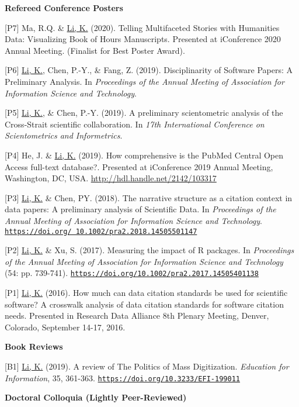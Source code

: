 \documentclass[margin, 10pt]{res} %
\begin{document}
\begin{resume}
\textbf{Refereed Conference Posters}

[P7] Ma, R.Q. \& \underline{Li, K.} (2020). Telling Multifaceted Stories with Humanities Data: Visualizing Book of Hours Manuscripts. Presented at iConference 2020 Annual Meeting. (Finalist for Best Poster Award).

[P6] \underline{Li, K.}, Chen, P.-Y., \& Fang, Z. (2019). Disciplinarity of Software Papers: A Preliminary Analysis. In \textit{Proceedings of the Annual Meeting of Association for Information Science and Technology}.

[P5] \underline{Li, K.}, \& Chen, P.-Y. (2019). A preliminary scientometric analysis of the Cross-Strait scientific collaboration. In \textit{17th International Conference on Scientometrics and Informetrics}.

[P4] He, J. \& \underline{Li, K.} (2019). How comprehensive is the PubMed Central Open Access full-text database?. Presented at iConference 2019 Annual Meeting, Washington, DC, USA. \href{http://hdl.handle.net/2142/103317}{http://hdl.handle.net/2142/103317}

[P3] \underline{Li, K.} \& Chen, PY. (2018). The narrative structure as a citation context in data papers: A preliminary analysis of Scientific Data. In \textit{Proceedings of the Annual Meeting of Association for Information Science and Technology}. \href{https://doi.org/10.1002/pra2.2018.14505501147}{\nolinkurl{https://doi.org/ 10.1002/pra2.2018.14505501147}}

[P2] \underline{Li, K.} \& Xu, S. (2017). Measuring the impact of R packages. In \textit{Proceedings of the Annual Meeting of Association for Information Science and Technology} (54: pp. 739-741). \href{https://doi.org/10.1002/pra2.2017.14505401138}{\nolinkurl{https://doi.org/10.1002/pra2.2017.14505401138}}

[P1] \underline{Li, K.} (2016). How much can data citation standards be used for scientific software? A crosswalk analysis of data citation standards for software citation needs. Presented in Research Data Alliance 8th Plenary Meeting, Denver, Colorado, September 14-17, 2016.

\textbf{Book Reviews}

[B1] \underline{Li, K.} (2019). A review of The Politics of Mass Digitization. \textit{Education for Information}, 35, 361-363. \href{https://doi.org/10.3233/EFI-199011}{\nolinkurl{https://doi.org/10.3233/EFI-199011}}

\textbf{Doctoral Colloquia (Lightly Peer-Reviewed)}


\end{resume}
\end{document}
